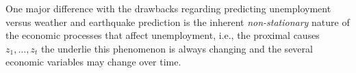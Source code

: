 \documentclass[12pt]{article}
\begin{document}
\begin{enumerate}
\begin{tcolorbox}[colback = white, sharp corners]
One major difference with the drawbacks regarding predicting unemployment versus weather and earthquake prediction is the inherent \emph{non-stationary} nature of the economic processes that affect unemployment, i.e., the proximal causes $z_1, \ldots, z_t$ the underlie this phenomenon is always changing and the several economic variables may change over time. 

\end{tcolorbox}


\begin{tcolorbox}[colback = white, sharp corners]


\end{tcolorbox}

\end{enumerate}

\newpage
\end{document}
